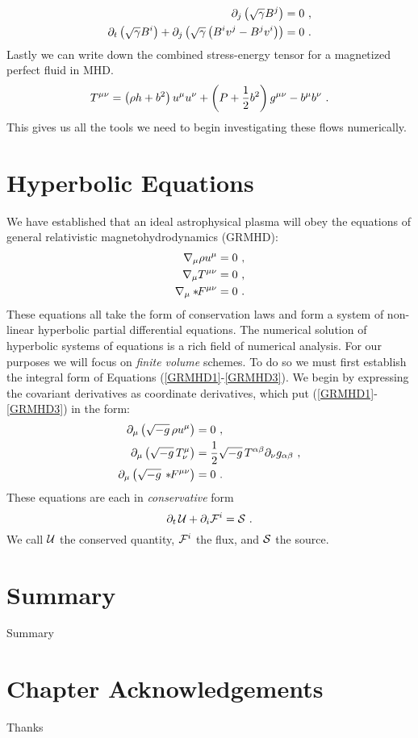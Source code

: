     \begin{align}
    	\partial_j \left( \sqrt{\gamma} B^j \right) &= 0 \ , \\
	\partial_t \left( \sqrt{\gamma} B^i \right) + \partial_j \left(\sqrt{\gamma}\left(B^i v^j - B^j v^i\right)\right) &= 0\ .
    \end{align}
    Lastly we can write down the combined stress-energy tensor for a magnetized perfect fluid in MHD.
    \begin{equation}
    	T^{\mu\nu} = \left(\rho h + b^2\right) u^\mu u^\nu + \left(P + \frac{1}{2}b^2\right)g^{\mu\nu} - b^\mu b^\nu \ . \eqlabel{TmunuGRMHD}
    \end{equation}
    This gives us all the tools we need to begin investigating these flows numerically.


\section{Hyperbolic Equations}

We have established that an ideal astrophysical plasma will obey the equations of general relativistic magnetohydrodynamics (GRMHD):
\begin{align}
	\nabla_\mu  \rho u^\mu &= 0\ , \eqlabel{GRMHD1}\\
	\nabla_\mu T^{\mu\nu} &= 0\ , \eqlabel{GRMHD2}\\
	\nabla_\mu \dual{F}^{\mu\nu} &= 0\ . \eqlabel{GRMHD3}
\end{align}
These equations all take the form of conservation laws and form a system of non-linear hyperbolic partial differential equations.  The numerical solution of hyperbolic systems of equations is a rich field of numerical analysis.  For our purposes we will focus on \emph{finite volume} schemes.  To do so we must first establish the integral form of Equations (\eqref{GRMHD1}-\eqref{GRMHD3}).  We begin by expressing the covariant derivatives as coordinate derivatives, which put (\eqref{GRMHD1}-\eqref{GRMHD3}) in the form:
\begin{align}
	\partial_\mu \left(\sqrt{-g}\ \! \rho u^\mu\right) &= 0\ , \\
	\partial_\mu\left( \sqrt{-g}\ \!T^{\mu}_\nu\right) &= \frac{1}{2}\sqrt{-g}\ \!T^{\alpha\beta}\partial_\nu g_{\alpha \beta}\ , \\
	\partial_\mu \left(\sqrt{-g}\ \! \dual{F}^{\mu\nu}\right) &= 0\ . \eqlabel{GRMHDcoord}
\end{align}
These equations are each in \emph{conservative} form
\begin{equation}
	\partial_t\ \!\mathcal{U} + \partial_i \mathcal{F}^i = \mathcal{S} \ .
\end{equation}
We call $\mathcal{U}$ the conserved quantity, $\mathcal{F}^i$ the flux, and $\mathcal{S}$ the source.



\section{Summary}


Summary

\section{Chapter Acknowledgements} 

Thanks